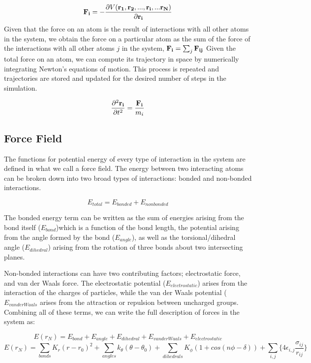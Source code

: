 \begin{equation}
\mathbf{F_i}  = -\frac{\partial V(\mathbf{r_1}, \mathbf{r_2}, ..., \mathbf{r_i}, ... \mathbf{r_N)}}{\partial \mathbf{r_i}} 
 \end{equation}
 Given that the force on an atom is the result of interactions with all other atoms in the system, we obtain the force on a particular atom as the sum of the force of the interactions with all other atoms $j$ in the system,  $\mathbf{F_i} = \sum_{j} \mathbf{F_{ij}}$ Given the total force on an atom, we can compute its trajectory in space by numerically integrating Newton's equations of motion. This process is repeated and trajectories are stored and updated for the desired number of steps in the simulation.
 
 \begin{equation}
 \frac{\partial^2 \mathbf{r_{i}}}{\partial t^2} = \frac{\mathbf{F_i}}{m_i}
\end{equation}

\subsection{Force Field}

The functions for potential energy of every type of interaction in the system are defined in what we call a force field. The energy between two interacting atoms can be broken down into two broad types of interactions: bonded and non-bonded interactions.

\begin{equation}
E_{total} = E_{bonded} + E_{non bonded}
\end{equation}

The bonded energy term can be written as the sum of energies arising from the bond itself  ($E_{bond}$)which is a function of the bond length, the potential arising from the angle formed by the bond ($E_{angle}$), as well as the torsional/dihedral angle ($E_{dihedral}$) arising from the rotation of three bonds about two intersecting planes.

Non-bonded interactions can have two contributing factors; electrostatic force, and van der Waals force. The electrostatic potential ($E_{electrostatic}$) arises from the interaction of the charges of particles, while the van der Waals potential  ($E_{van der Waals}$ arises from the attraction or repulsion between uncharged groups. Combining all of these terms, we can write the full description of forces in the system as:

\begin{equation}
E(r_{N}) = E_{bond} + E_{angle} + E_{dihedral} + E_{van der Waals} + E_{electrostatic} 
\end{equation}
\begin{equation}
E(r_{N}) = \sum_{bonds} K_{r} (r - r_{0})^2	 + \sum_{angles} k_{\theta} (\theta - \theta_0) + \sum_{dihedrals} K_{\phi} (1 + cos(n\phi - \delta)) + \sum_{i,j} \{ 4\epsilon_{i,j} \frac{\sigma_{ij}}{r_{ij}} \}
\end{equation}


